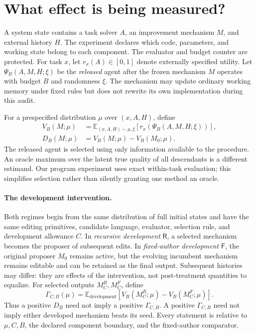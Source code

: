 \documentclass{article}
\theoremstyle{definition}
\newcommand{\E}{\mathbb E}
\newcommand{\authorR}{\mathsf R}
\newcommand{\authorF}{\mathsf F}
\begin{document}
\section{What effect is being measured?}\label{sec:setup}
A system state contains a task solver $A$, an improvement mechanism $M$, and external history $H$. The experiment declares which code, parameters, and working state belong to each component. The evaluator and budget counter are protected. For task $x$, let $r_x(A)\in[0,1]$ denote externally specified utility. Let $\Psi_B(A,M,H;\xi)$ be the \emph{released} agent after the frozen mechanism $M$ operates with budget $B$ and randomness $\xi$. The mechanism may update ordinary working memory under fixed rules but does not rewrite its own implementation during this audit.

For a prespecified distribution $\mu$ over $(x,A,H)$, define
\begin{align}
 V_B(M;\mu)&=\E_{(x,A,H)\sim\mu,\xi}[r_x(\Psi_B(A,M,H;\xi))],\label{eq:V}\\
 D_B(M;\mu)&=V_B(M;\mu)-V_B(M_0;\mu).\label{eq:D}
\end{align}
The released agent is selected using only information available to the procedure. An oracle maximum over the latent true quality of all descendants is a different estimand. Our program experiment uses exact within-task evaluation; this simplifies selection rather than silently granting one method an oracle.

\paragraph{The development intervention.}
Both regimes begin from the same distribution of full initial states and have the same editing primitives, candidate language, evaluator, selection rule, and development allowance $C$. In \emph{recursive development} $\authorR$, a selected mechanism becomes the proposer of subsequent edits. In \emph{fixed-author development} $\authorF$, the original proposer $M_0$ remains active, but the evolving incumbent mechanism remains editable and can be retained as the final output. Subsequent histories may differ: they are effects of the intervention, not post-treatment quantities to equalize. For selected outputs $M_C^R,M_C^F$, define
\begin{equation}
 \Gamma_{C,B}(\mu)=\E_{\mathrm{development}}[V_B(M_C^R;\mu)-V_B(M_C^F;\mu)].\label{eq:Gamma}
\end{equation}
Thus a positive $D_B$ need not imply a positive $\Gamma_{C,B}$. A positive $\Gamma_{C,B}$ need not imply either developed mechanism beats its seed. Every statement is relative to $\mu,C,B$, the declared component boundary, and the fixed-author comparator.
\end{document}
